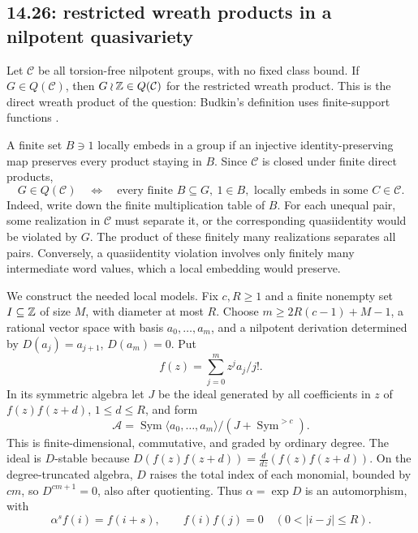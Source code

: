 \subsection{14.26: restricted wreath products in a nilpotent quasivariety}
\label{cand:14.26}
Let \(\mathcal C\) be all torsion-free nilpotent groups, with no fixed
class bound. If \(G\in Q(\mathcal C)\), then \(G\wr\mathbb Z\in Q(\mathcal C)\)
for the restricted wreath product. This is the direct wreath
product of the question: Budkin's definition uses finite-support
functions \cite[Section~1]{budkin-wreath}.

A finite set \(B\ni1\) locally embeds in a group if an injective
identity-preserving map preserves every product staying in \(B\).
Since \(\mathcal C\) is closed under finite direct products,
\[
 G\in Q(\mathcal C)
 \quad\Longleftrightarrow\quad
 \text{every finite }B\subseteq G,\ 1\in B,
 \text{ locally embeds in some }C\in\mathcal C.
\]
Indeed, write down the finite multiplication table of \(B\).
For each unequal pair, some realization in \(\mathcal C\) must separate
it, or the corresponding quasiidentity would be violated by \(G\).
The product of these finitely many realizations separates all pairs.
Conversely, a quasiidentity violation involves only finitely many
intermediate word values, which a local embedding would preserve.

We construct the needed local models. Fix \(c,R\ge1\) and a finite
nonempty set \(I\subseteq\mathbb Z\) of size \(M\), with diameter at most \(R\).
Choose \(m\ge2R(c-1)+M-1\), a rational vector space with basis
\(a_0,\ldots,a_m\), and a nilpotent derivation determined by
\(D(a_j)=a_{j+1}\), \(D(a_m)=0\). Put
\[
 f(z)=\sum_{j=0}^m z^ja_j/j!.
\]
In its symmetric algebra let \(J\) be the ideal generated by all
coefficients in \(z\) of \(f(z)f(z+d)\), \(1\le d\le R\), and form
\[
 \mathcal A=\operatorname{Sym}\langle a_0,\ldots,a_m\rangle/
       (J+\operatorname{Sym}^{>c}).
\]
This is finite-dimensional, commutative, and graded by ordinary degree.
The ideal is \(D\)-stable because
\(D(f(z)f(z+d))=\frac{d}{dz}(f(z)f(z+d))\).
On the degree-truncated algebra, \(D\) raises the total index of each
monomial, bounded by \(cm\), so \(D^{cm+1}=0\), also after quotienting.
Thus \(\alpha=\exp D\) is an automorphism, with
\[
 \alpha^sf(i)=f(i+s),\qquad
 f(i)f(j)=0\quad(0<|i-j|\le R).                    \tag{a}
\]

